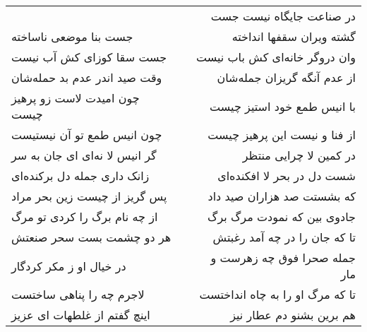 \begin{center}
\begin{longtable}{l p{0.5cm} r}
&&
در صناعت جایگاه نیست جست
\\
جست بنا موضعی ناساخته
&&
گشته ویران سقفها انداخته
\\
جست سقا کوزای کش آب نیست
&&
وان دروگر خانه‌ای کش باب نیست
\\
وقت صید اندر عدم بد حمله‌شان
&&
از عدم آنگه گریزان جمله‌شان
\\
چون امیدت لاست زو پرهیز چیست
&&
با انیس طمع خود استیز چیست
\\
چون انیس طمع تو آن نیستیست
&&
از فنا و نیست این پرهیز چیست
\\
گر انیس لا نه‌ای ای جان به سر
&&
در کمین لا چرایی منتظر
\\
زانک داری جمله دل برکنده‌ای
&&
شست دل در بحر لا افکنده‌ای
\\
پس گریز از چیست زین بحر مراد
&&
که بشستت صد هزاران صید داد
\\
از چه نام برگ را کردی تو مرگ
&&
جادوی بین که نمودت مرگ برگ
\\
هر دو چشمت بست سحر صنعتش
&&
تا که جان را در چه آمد رغبتش
\\
در خیال او ز مکر کردگار
&&
جمله صحرا فوق چه زهرست و مار
\\
لاجرم چه را پناهی ساختست
&&
تا که مرگ او را به چاه انداختست
\\
اینچ گفتم از غلطهات ای عزیز
&&
هم برین بشنو دم عطار نیز
\\
\end{longtable}
\end{center}
